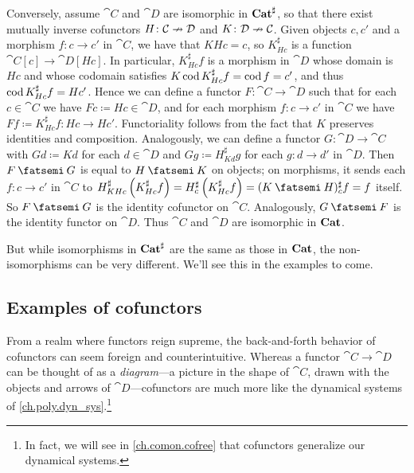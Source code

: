 \documentclass[Book-Poly]{subfiles}
\begin{document}
\begin{exercise}
\begin{solution}
Conversely, assume $\cat{C}$ and $\cat{D}$ are isomorphic in $\mathbf{Cat}^\sharp$, so that there exist mutually inverse cofunctors $H\colon\mathcal{C}\nrightarrow\mathcal{D}$ and $K\colon\mathcal{D}\nrightarrow\mathcal{C}$.
Given objects $c,c'$ and a morphism $f\colon c\to c'$ in $\cat{C}$, we have that $KHc=c$, so $K^\sharp_{Hc}$ is a function $\cat{C}[c]\to\cat{D}[Hc]$.
In particular, $K^\sharp_{Hc}f$ is a morphism in $\cat{D}$ whose domain is $Hc$ and whose codomain satisfies $K\operatorname{cod} K^\sharp_{Hc}f=\operatorname{cod} f=c'$, and thus $\operatorname{cod} K^\sharp_{Hc}f=Hc'$.
Hence we can define a functor $F\colon\cat{C}\to\cat{D}$ such that for each $c\in\cat{C}$ we have $Fc\coloneqq Hc\in\cat{D}$, and for each morphism $f\colon c\to c'$ in $\cat{C}$ we have $Ff\coloneqq K^\sharp_{Hc}f\colon Hc\to Hc'$.
Functoriality follows from the fact that $K$ preserves identities and composition.
Analogously, we can define a functor $G\colon\cat{D}\to\cat{C}$ with $Gd\coloneqq Kd$ for each $d\in\cat{D}$ and $Gg\coloneqq H^\sharp_{Kd}g$ for each $g\colon d\to d'$ in $\cat{D}$.
Then $F\then G$ is equal to $H\then K$ on objects; on morphisms, it sends each $f\colon c\to c'$ in $\cat{C}$ to $H^\sharp_{KHc}\left(K^\sharp_{Hc}f\right)=H^\sharp_c\left(K^\sharp_{Hc}f\right)=(K\then H)^\sharp_cf=f$ itself.
So $F\then G$ is the identity cofunctor on $\cat{C}$.
Analogously, $G\then F$ is the identity functor on $\cat{D}$.
Thus $\cat{C}$ and $\cat{D}$ are isomorphic in $\mathbf{Cat}$.
\end{solution}
\end{exercise}
But while isomorphisms in $\mathbf{Cat}^\sharp$ are the same as those in $\mathbf{Cat}$, the non-isomorphisms can be very different.
We'll see this in the examples to come.

\subsection{Examples of cofunctors}

From a realm where functors reign supreme, the back-and-forth behavior of cofunctors can seem foreign and  counterintuitive.
Whereas a functor $\cat{C}\to\cat{D}$ can be thought of as a \emph{diagram}---a picture in the shape of $\cat{C}$, drawn with the objects and arrows of $\cat{D}$---cofunctors are much more like the dynamical systems of \cref{ch.poly.dyn_sys}.\footnote{In fact, we will see in \cref{ch.comon.cofree} that cofunctors generalize our dynamical systems.}
\end{document}
